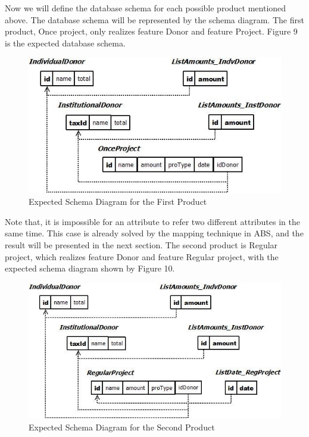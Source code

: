 \documentclass[runningheads,a4paper]{llncs}
\begin{document}
Now we will define the database schema for each possible product mentioned above. The database schema will be represented by the schema diagram. The first product, Once project, only realizes feature Donor and feature Project. Figure 9 is the expected database schema.

\begin{figure}
	\centering
	\includegraphics[scale=0.7]{db4.jpg}
	\caption{Expected Schema Diagram for the First Product}
	\label{Figure 9}
\end{figure}

Note that, it is impossible for an attribute to refer two different attributes in the same time. This case is already solved by the mapping technique in ABS, and the result will be presented in the next section. The second product is Regular project, which realizes feature Donor and feature Regular project, with the expected schema diagram shown by Figure 10.

\begin{figure}
	\centering
	\includegraphics[scale=0.7]{db5.jpg}
	\caption{Expected Schema Diagram for the Second Product}
	\label{Figure 10}
\end{figure}
\end{document}

